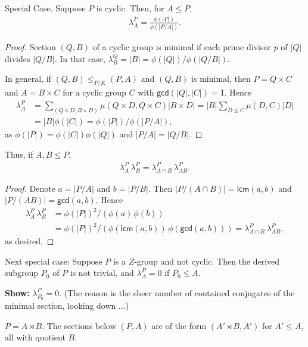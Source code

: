 \documentclass[12pt,a4paper]{amsart}
\newcommand{\Size}[1]{\left|#1\right|}
\renewcommand{\gcd}{\mathsf{gcd}}
\newcommand{\lcm}{\mathsf{lcm}}
\begin{document}
Special Case. Suppose $P$ is cyclic.  Then, for $A \leq P$,
\begin{align*}
  \lambda^P_A = \frac{\phi(\Size{P})}{\phi(\Size{P/A})}.
\end{align*}
\begin{proof}
  Section $(Q, B)$ of a cyclic group is minimal if each prime divisor $p$ of
  $\Size{Q}$ divides  $\Size{Q/B}$.
  In that case, $\lambda^Q_B = \Size{B} = \phi(\Size{Q}) / \phi(\Size{Q/B})$.

  In general, if $(Q, B) \leq_{P/K} (P, A)$ and $(Q, B)$ is minimal,
  then $P = Q \times C$ and $A = B \times C$
  for a cyclic group $C$ with $\gcd(\Size{Q}, \Size{C}) = 1$.
  Hence
  \begin{align*}
    \lambda^P_A &= \sum_{(Q \times D, B \times D)} \mu(Q \times D, Q \times C) \Size{B \times D} = \Size{B} \sum_{D \leq C} \mu(D, C) \Size{D} \\
     & = \Size{B} \phi(\Size{C}) = \phi(\Size{P}) / \phi(\Size{P/A}),
  \end{align*}
  as $\phi(\Size{P}) = \phi(\Size{C}) \phi(\Size{Q})$
  and $\Size{P/A} = \Size{Q/B}$.
\end{proof}

Thus, if $A, B \leq P$,
\begin{align*}
  \lambda^P_A\, \lambda^P_B = \lambda^P_{A \cap B}\, \lambda^P_{AB}.
\end{align*}
\begin{proof}
  Denote $a = \Size{P/A}$ and $b = \Size{P/B}$. Then
  $\Size{P/(A\cap B)} = \lcm(a, b)$ and
  $\Size{P/(AB)} = \gcd(a, b)$.  Hence
  \begin{align*}
    \lambda^P_A\, \lambda^P_B
    &=
    \phi(\Size{P})^2 / (\phi(a)\, \phi(b)) \\
    &=
    \phi(\Size{P})^2 / (\phi(\lcm(a, b))\, \phi(\gcd(a, b)))
    = \lambda^P_{A \cap B}\, \lambda^P_{AB},
  \end{align*}
  as desired.
\end{proof}

Next special case: Suppose $P$ is a $Z$-group and not cyclic.
Then the derived subgroup $P_0$ of $P$ is not trivial, and
$\lambda^P_A = 0$ if $P_0 \leq A$.

\textbf{Show:} $\lambda^P_{P_0} = 0$.  (The reason is the sheer number of
contained conjugates of the minimal section, looking down ...)

$P = A \rtimes B$.  The sections below $(P, A)$ are of the form
$(A' \rtimes B, A')$ for $A' \leq A$, all with quotient $B$.
\end{document}
